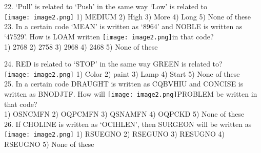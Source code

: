 \documentclass[
]{article}
\begin{document}
22. ‘Pull’ is related to ‘Push’ in the same way ‘Low’ is related to\\
\texttt{[image: image2.png]}
1) MEDIUM \hspace{2mm}2) High \hspace{2mm}3) More \hspace{2mm}4) Long \hspace{2mm}5) None of these\\

23. In a certain code ‘MEAN’ is written as ‘8964’ and NOBLE is written as ‘47529’. How is
LOAM written \texttt{[image: image2.png]}in that code?\\
1) 2768 \hspace{2mm}2) 2758 \hspace{2mm}3) 2968 \hspace{2mm}4) 2468 \hspace{2mm}5) None of these

24. RED is related to ‘STOP’ in the same way GREEN is related to?\\
\texttt{[image: image2.png]}
1) Color \hspace{2mm}2) paint \hspace{2mm}3) Lamp \hspace{2mm}4) Start \hspace{2mm}5) None of these\\

25. In a certain code DRAUGHT is written as CQBVHIU and CONCISE is written as BNODJTF. How will \texttt{[image: image2.png]}PROBLEM be written in that code?\\
1) OSNCMFN \hspace{2mm}2) OQPCMFN \hspace{2mm}3) QSNAMFN \hspace{2mm}4) OQPCKD \hspace{2mm}5) None of these\\

26. If CHOLINE is written as ‘OCIHLEN’, then SURGEON will be written as\\
\texttt{[image: image2.png]}
1) RSUEGNO \hspace{2mm}2) RSEGUNO \hspace{2mm}3) RESUGNO \hspace{2mm}4) RSEUGNO \hspace{2mm}5) None of these\\
\end{document}
